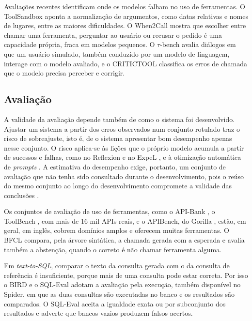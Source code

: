 Avaliações recentes identificam onde os modelos falham no uso de ferramentas. O ToolSandbox \cite{lu2025toolsandbox} aponta a normalização de argumentos, como datas relativas e nomes de lugares, entre as maiores dificuldades. O When2Call \cite{ross2025when2call} mostra que escolher entre chamar uma ferramenta, perguntar ao usuário ou recusar o pedido é uma capacidade própria, fraca em modelos pequenos. O $\tau$-bench \cite{yao2025taubench} avalia diálogos em que um usuário simulado, também conduzido por um modelo de linguagem, interage com o modelo avaliado, e o CRITICTOOL \cite{huang2025critictool} classifica os erros de chamada que o modelo precisa perceber e corrigir.

\subsection{Avaliação}
\label{sec:avaliacao-conceitos}

A validade da avaliação depende também de como o sistema foi desenvolvido. Ajustar um sistema a partir dos erros observados num conjunto rotulado traz o risco de sobreajuste, isto é, de o sistema apresentar bom desempenho apenas nesse conjunto. O risco aplica-se às lições que o próprio modelo acumula a partir de sucessos e falhas, como no Reflexion \cite{shinn2023reflexion} e no ExpeL \cite{zhao2024expel}, e à otimização automática de \textit{prompts} \cite{yang2024opro, khattab2024dspy}. A estimativa do desempenho exige, portanto, um conjunto de avaliação que não tenha sido consultado durante o desenvolvimento, pois o reúso do mesmo conjunto ao longo do desenvolvimento compromete a validade das conclusões \cite{dwork2015reusable}.

Os conjuntos de avaliação de uso de ferramentas, como o API-Bank \cite{li2023apibank}, o ToolBench \cite{qin2023toolllm}, com mais de 16 mil APIs reais, e o APIBench, do Gorilla \cite{patil2023gorilla}, estão, em geral, em inglês, cobrem domínios amplos e oferecem muitas ferramentas. O BFCL \cite{patil2025berkeley} compara, pela árvore sintática, a chamada gerada com a esperada e avalia também a abstenção, quando o correto é não chamar ferramenta alguma.

Em \textit{text-to-SQL}, comparar o texto da consulta gerada com o da consulta de referência é insuficiente, porque mais de uma consulta pode estar correta. Por isso o BIRD e o SQL-Eval \cite{defog2023sqleval} adotam a avaliação pela execução, também disponível no Spider, em que as duas consultas são executadas no banco e os resultados são comparados. O SQL-Eval aceita a igualdade exata ou por subconjunto dos resultados e adverte que bancos vazios produzem falsos acertos.

